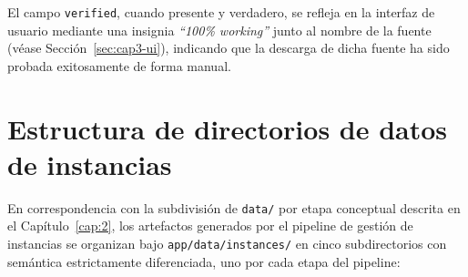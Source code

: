 El campo \texttt{verified}, cuando presente y verdadero, se refleja en la
interfaz de usuario mediante una insignia \emph{``100\% working''} junto al
nombre de la fuente (v\'ease Secci\'on~\ref{sec:cap3-ui}), indicando que la
descarga de dicha fuente ha sido probada exitosamente de forma manual.

\section{Estructura de directorios de datos de instancias}
\label{sec:cap3-directorios}

En correspondencia con la subdivisi\'on de \texttt{data/} por etapa
conceptual descrita en el Cap\'itulo~\ref{cap:2}, los artefactos generados
por el pipeline de gesti\'on de instancias se organizan bajo
\texttt{app/data/instances/} en cinco subdirectorios con sem\'antica
estrictamente diferenciada, uno por cada etapa del pipeline:

